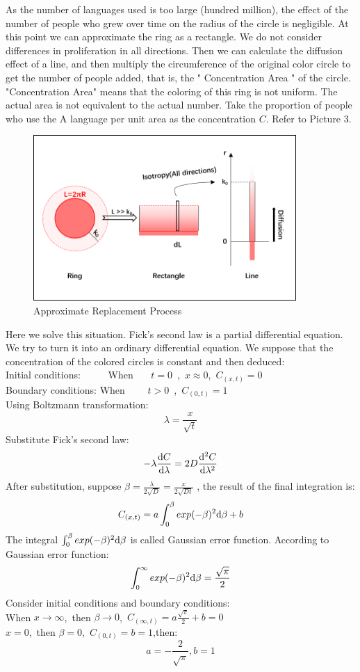 \documentclass{mcmthesis}
\begin{document}
    As the number of languages used is too large (hundred million),
    the effect of the number of people who grew over time on the radius of the circle is negligible.
    At this point we can approximate the ring as a rectangle.
    We do not consider differences in proliferation in all directions.
    Then we can calculate the diffusion effect of a line,
    and then multiply the circumference of the original color circle
    to get the number of people added, that is, the " Concentration Area " of the circle.
    "Concentration Area" means that the coloring of this ring is not uniform.
    The actual area is not equivalent to the actual number.
    Take the proportion of people who use the A language per unit area as the concentration $C$.
    Refer to Picture 3.

    \begin{figure}[h]
          \centering
          \includegraphics[height=6.3cm,width=10cm]{p3.png}
          \caption{Approximate Replacement Process}
          \label{p3}
        \end{figure}

    Here we solve this situation.
    Fick's second law is a partial differential equation.
    We try to turn it into an ordinary differential equation.
    We suppose that the concentration of the colored circles is constant and then deduced:
    \\Initial conditions: \ \ \ \ \  When \ \ \ $t=0$\ ,\ $x\approx 0$,\ $C_{(x,t)}=0$
    \\Boundary conditions: When \ \ \ \ $t>0$\ ,\ $C_{(0,t)}=1$%
    \\Using Boltzmann transformation:
    $$\lambda=\frac{x}{\sqrt{t}}$$
    Substitute Fick's second law:
    $$-\lambda\frac{{\rm d}C}{{\rm d}\lambda}=2D\frac{{\rm d}^2C}{{\rm d}\lambda^2}$$
    After substitution, suppose $\beta=\frac{\lambda}{2\sqrt{D}}=\frac{x}{2\sqrt{Dt}}$ ,
    the result of the final integration is:
    $$C_{(x,t)}=a\int_0^\beta exp(-\beta)^2{\rm d}\beta+b$$
    The integral $\int_0^\beta exp(-\beta)^2{\rm d}\beta$ is called Gaussian error function.
    According to Gaussian error function:
    $$\int_0^\infty exp(-\beta)^2{\rm d}\beta=\frac{\sqrt{\pi}}{2}$$
    Consider initial conditions and boundary conditions:
    \\When $x\rightarrow\infty$,\ then $\beta\rightarrow 0$,\ $C_{(\infty,t)}=a\frac{\sqrt{\pi}}{2}+b=0$
    \\$x=0$,\ then $\beta=0$,\ $C_{(0,t)}=b=1$,then:
    $$a=-\frac{2}{\sqrt{\pi}},b=1$$
\end{document}
